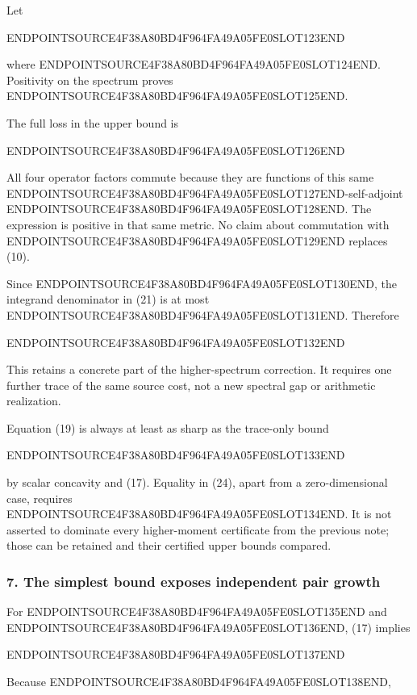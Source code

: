 Let

ENDPOINTSOURCE4F38A80BD4F964FA49A05FE0SLOT123END

where ENDPOINTSOURCE4F38A80BD4F964FA49A05FE0SLOT124END. Positivity on the spectrum proves ENDPOINTSOURCE4F38A80BD4F964FA49A05FE0SLOT125END.

The full loss in the upper bound is

ENDPOINTSOURCE4F38A80BD4F964FA49A05FE0SLOT126END

All four operator factors commute because they are functions of this same ENDPOINTSOURCE4F38A80BD4F964FA49A05FE0SLOT127END-self-adjoint ENDPOINTSOURCE4F38A80BD4F964FA49A05FE0SLOT128END. The expression is positive in that same metric. No claim about commutation with ENDPOINTSOURCE4F38A80BD4F964FA49A05FE0SLOT129END replaces (10).

Since ENDPOINTSOURCE4F38A80BD4F964FA49A05FE0SLOT130END, the integrand denominator in (21) is at most ENDPOINTSOURCE4F38A80BD4F964FA49A05FE0SLOT131END. Therefore

ENDPOINTSOURCE4F38A80BD4F964FA49A05FE0SLOT132END

This retains a concrete part of the higher-spectrum correction. It requires one further trace of the same source cost, not a new spectral gap or arithmetic realization.

Equation (19) is always at least as sharp as the trace-only bound

ENDPOINTSOURCE4F38A80BD4F964FA49A05FE0SLOT133END

by scalar concavity and (17). Equality in (24), apart from a zero-dimensional case, requires ENDPOINTSOURCE4F38A80BD4F964FA49A05FE0SLOT134END. It is not asserted to dominate every higher-moment certificate from the previous note; those can be retained and their certified upper bounds compared.

\subsubsection{7. The simplest bound exposes independent pair growth}\label{endpoint-relation_moment_original--the-simplest-bound-exposes-independent-pair-growth}

For ENDPOINTSOURCE4F38A80BD4F964FA49A05FE0SLOT135END and ENDPOINTSOURCE4F38A80BD4F964FA49A05FE0SLOT136END, (17) implies

ENDPOINTSOURCE4F38A80BD4F964FA49A05FE0SLOT137END

Because ENDPOINTSOURCE4F38A80BD4F964FA49A05FE0SLOT138END,


